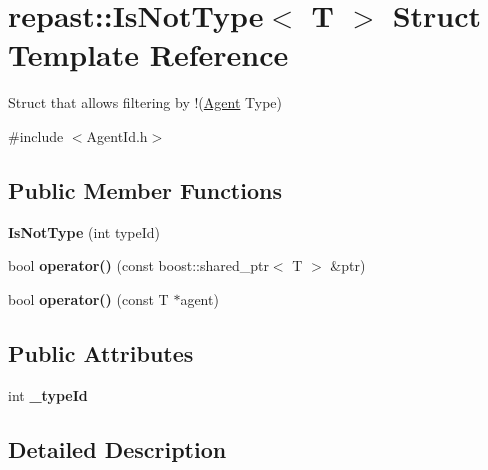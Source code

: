 \hypertarget{structrepast_1_1_is_not_type}{\section{repast\-:\-:Is\-Not\-Type$<$ T $>$ Struct Template Reference}
\label{structrepast_1_1_is_not_type}
}


Struct that allows filtering by !(\hyperlink{classrepast_1_1_agent}{Agent} Type)  




{\ttfamily \#include $<$Agent\-Id.\-h$>$}

\subsection*{Public Member Functions}
\begin{DoxyCompactItemize}
\item 
\hypertarget{structrepast_1_1_is_not_type_a234ea8aeff3917ef9a3d94b3c14eb369}{{\bfseries Is\-Not\-Type} (int type\-Id)}\label{structrepast_1_1_is_not_type_a234ea8aeff3917ef9a3d94b3c14eb369}

\item 
\hypertarget{structrepast_1_1_is_not_type_a0b2ee838f9eca383b54e2a581fe47f94}{bool {\bfseries operator()} (const boost\-::shared\-\_\-ptr$<$ T $>$ \&ptr)}\label{structrepast_1_1_is_not_type_a0b2ee838f9eca383b54e2a581fe47f94}

\item 
\hypertarget{structrepast_1_1_is_not_type_a24299271f22793fd7d4a76f94fb88e70}{bool {\bfseries operator()} (const T $\ast$agent)}\label{structrepast_1_1_is_not_type_a24299271f22793fd7d4a76f94fb88e70}

\end{DoxyCompactItemize}
\subsection*{Public Attributes}
\begin{DoxyCompactItemize}
\item 
\hypertarget{structrepast_1_1_is_not_type_a58ce9b0f12b75b1fead7bff825f8d97e}{int {\bfseries \-\_\-type\-Id}}\label{structrepast_1_1_is_not_type_a58ce9b0f12b75b1fead7bff825f8d97e}

\end{DoxyCompactItemize}


\subsection{Detailed Description}
